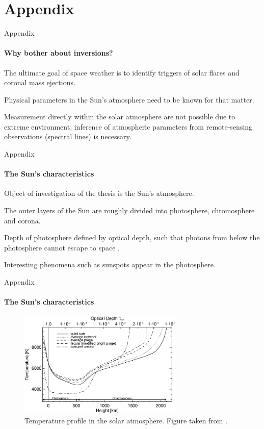 \documentclass{beamer}
\begin{document}
\section*{Appendix}
\begin{frame}[allowframebreaks]{Appendix}
	\framesubtitle{Why bother about inversions?}
	The ultimate goal of space weather is to identify triggers of solar flares and coronal mass ejections.
	
	Physical parameters in the Sun's atmosphere need to be known for that matter.
	
	Measurement directly within the solar atmosphere are not possible due to extreme environment; inference of atmospheric parameters from remote-sensing observations (spectral lines) is necessary.
\end{frame}

\begin{frame}[allowframebreaks]{Appendix}
	\framesubtitle{The Sun's characteristics}
	Object of investigation of the thesis is the Sun's atmosphere.
	
	The outer layers of the Sun are roughly divided into photosphere, chromosphere and corona.
	
	Depth of photosphere defined by optical depth, such that photons from below the photosphere cannot escape to space \cite[p.135]{Weigert.2006}.
	
	Interesting phenomena such as sunspots appear in the photosphere.
	
\end{frame}

\begin{frame}[allowframebreaks]{Appendix}
	\framesubtitle{The Sun's characteristics}
	\begin{figure}[h]
		\centering
		\includegraphics[width=0.7\textwidth]{figures/presentation/tempprofile.png}
		\caption{Temperature profile in the solar atmosphere. Figure taken from \cite[p.281]{Froehlich.2004}.}
	\end{figure}
\end{frame}
\end{document}
